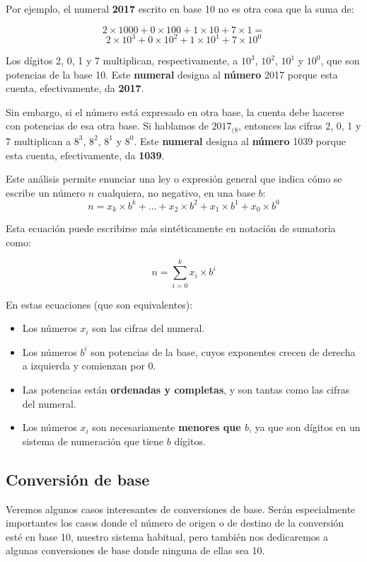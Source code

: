 \documentclass[spanish,a4paper,]{article}
\providecommand{\tightlist}{%
  \setlength{\itemsep}{0pt}\setlength{\parskip}{0pt}}
\begin{document}
Por ejemplo, el numeral \textbf{2017} escrito en base 10 no es otra cosa
que la suma de:

\[2 \times 1000 + 0 \times 100 + 1 \times 10 + 7 \times 1 = \]
\[2 \times 10^3 + 0 \times 10^2 + 1 \times 10^1 + 7 \times 10^0\]

Los dígitos 2, 0, 1 y 7 multiplican, respectivamente, a \(10^3\),
\(10^2\), \(10^1\) y \(10^0\), que son potencias de la base 10. Este
\textbf{numeral} designa al \textbf{número} 2017 porque esta cuenta,
efectivamente, da \textbf{2017}.

Sin embargo, si el número está expresado en otra base, la cuenta debe
hacerse con potencias de esa otra base. Si hablamos de \(2017_{(8}\),
entonces las cifras 2, 0, 1 y 7 multiplican a \(8^3\), \(8^2\), \(8^1\)
y \(8^0\). Este \textbf{numeral} designa al \textbf{número} 1039 porque
esta cuenta, efectivamente, da \textbf{1039}.

Este análisis permite enunciar una ley o expresión general que indica
cómo se escribe un número \(n\) cualquiera, no negativo, en una base
\(b\):
\[n = x_{k} \times b^k + \ldots + x_{2} \times b^{2} + x_1 \times b^1 +x_{0} \times b^0\]

Esta ecuación puede escribirse más sintéticamente en notación de
sumatoria como:

\[n = \sum_{i=0}^{k}{x_i \times b^i}\]

En estas ecuaciones (que son equivalentes):

\begin{itemize}
\tightlist
\item
  Los números \(x_i\) son las cifras del numeral.
\item
  Los números \(b^i\) son potencias de la base, cuyos exponentes crecen
  de derecha a izquierda y comienzan por 0.
\item
  Las potencias están \textbf{ordenadas y completas}, y son tantas como
  las cifras del numeral.
\item
  Los números \(x_i\) son necesariamente \textbf{menores que \(b\)}, ya
  que son dígitos en un sistema de numeración que tiene \(b\) dígitos.
\end{itemize}

\hypertarget{conversiuxf3n-de-base}{%
\subsection{Conversión de base}\label{conversiuxf3n-de-base}}

Veremos algunos casos interesantes de conversiones de base. Serán
especialmente importantes los casos donde el número de origen o de
destino de la conversión esté en base 10, nuestro sistema habitual, pero
también nos dedicaremos a algunas conversiones de base donde ninguna de
ellas sea 10.
\end{document}
